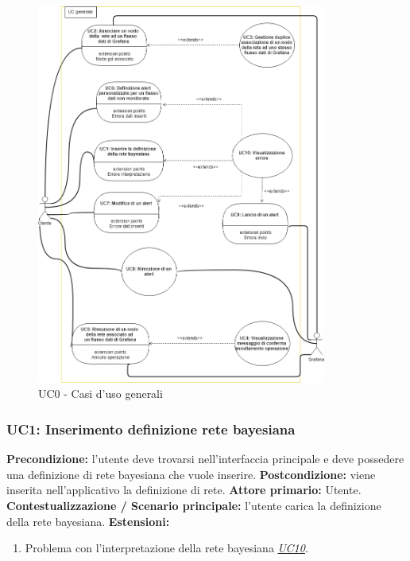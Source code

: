 		\begin{figure}[!htbp]
			\centering
			\includegraphics[width=0.85\textwidth]{UC.png}
			\caption{UC0 - Casi d'uso generali}
		\end{figure}
		\clearpage
		
		
				\subsubsection{UC1: Inserimento definizione rete bayesiana}
                    \textbf{Precondizione:} l’utente deve trovarsi nell’interfaccia principale e deve possedere una definizione di rete bayesiana che vuole inserire.
                    \newline
                    \textbf{Postcondizione:} viene inserita nell’applicativo la definizione di rete.
                    \newline
                    \textbf{Attore primario:} Utente.
                    \newline
                    \textbf{Contestualizzazione / Scenario principale:} l’utente carica la definizione della rete bayesiana.
                    \newline
                    \textbf{Estensioni:} 
                    	\begin{enumerate}
                            \item Problema con l’interpretazione della rete bayesiana \underline{\textit{UC10}}.
                        \end{enumerate}
                        
